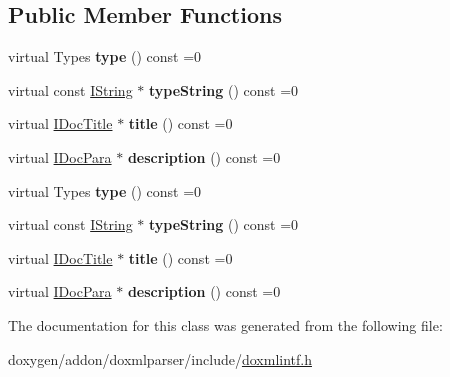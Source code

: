 \subsection*{Public Member Functions}
\begin{DoxyCompactItemize}
\item 
\mbox{\label{class_i_doc_simple_sect_a4c80c4ee74986436df9a3e072a9f9499}} 
virtual Types {\bfseries type} () const =0
\item 
\mbox{\label{class_i_doc_simple_sect_a7c0037f77a1963cb48c16cf57efa3bf3}} 
virtual const \mbox{\hyperlink{class_i_string}{I\+String}} $\ast$ {\bfseries type\+String} () const =0
\item 
\mbox{\label{class_i_doc_simple_sect_a6e8f455dca5863e6f58ef347f8b71f69}} 
virtual \mbox{\hyperlink{class_i_doc_title}{I\+Doc\+Title}} $\ast$ {\bfseries title} () const =0
\item 
\mbox{\label{class_i_doc_simple_sect_aaa4a5b7037af72d1d1a34c310d39a12d}} 
virtual \mbox{\hyperlink{class_i_doc_para}{I\+Doc\+Para}} $\ast$ {\bfseries description} () const =0
\item 
\mbox{\label{class_i_doc_simple_sect_a4c80c4ee74986436df9a3e072a9f9499}} 
virtual Types {\bfseries type} () const =0
\item 
\mbox{\label{class_i_doc_simple_sect_a7c0037f77a1963cb48c16cf57efa3bf3}} 
virtual const \mbox{\hyperlink{class_i_string}{I\+String}} $\ast$ {\bfseries type\+String} () const =0
\item 
\mbox{\label{class_i_doc_simple_sect_a6e8f455dca5863e6f58ef347f8b71f69}} 
virtual \mbox{\hyperlink{class_i_doc_title}{I\+Doc\+Title}} $\ast$ {\bfseries title} () const =0
\item 
\mbox{\label{class_i_doc_simple_sect_aaa4a5b7037af72d1d1a34c310d39a12d}} 
virtual \mbox{\hyperlink{class_i_doc_para}{I\+Doc\+Para}} $\ast$ {\bfseries description} () const =0
\end{DoxyCompactItemize}


The documentation for this class was generated from the following file\+:\begin{DoxyCompactItemize}
\item 
doxygen/addon/doxmlparser/include/\mbox{\hyperlink{include_2doxmlintf_8h}{doxmlintf.\+h}}\end{DoxyCompactItemize}
